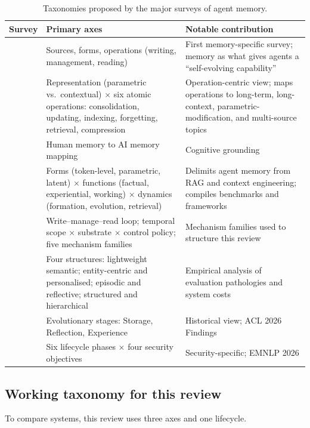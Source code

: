 \documentclass[11pt]{article}
\begin{document}
\begin{table}[t]
\centering\small
\begin{tabularx}{\textwidth}{L{3.2cm} L{6.2cm} X}
\toprule
\textbf{Survey} & \textbf{Primary axes} & \textbf{Notable contribution} \\
\midrule
\citet{zhang2024survey} & Sources, forms, operations (writing, management, reading) & First memory-specific survey; memory as what gives agents a ``self-evolving capability'' \\
\citet{du2025rethinking} & Representation (parametric vs.\ contextual) $\times$ six atomic operations: consolidation, updating, indexing, forgetting, retrieval, compression & Operation-centric view; maps operations to long-term, long-context, parametric-modification, and multi-source topics \\
\citet{wu2025humanmemory} & Human memory to AI memory mapping & Cognitive grounding \\
\citet{hu2025memoryage} & Forms (token-level, parametric, latent) $\times$ functions (factual, experiential, working) $\times$ dynamics (formation, evolution, retrieval) & Delimits agent memory from RAG and context engineering; compiles benchmarks and frameworks \\
\citet{du2026memory} & Write--manage--read loop; temporal scope $\times$ substrate $\times$ control policy; five mechanism families & Mechanism families used to structure this review \\
\citet{jiang2026anatomy} & Four structures: lightweight semantic; entity-centric and personalised; episodic and reflective; structured and hierarchical & Empirical analysis of evaluation pathologies and system costs \\
\citet{luo2026storage} & Evolutionary stages: Storage, Reflection, Experience & Historical view; ACL 2026 Findings \\
\citet{lin2026security} & Six lifecycle phases $\times$ four security objectives & Security-specific; EMNLP 2026 \\
\bottomrule
\end{tabularx}
\caption{Taxonomies proposed by the major surveys of agent memory.}
\label{tab:surveys}
\end{table}

\subsection{Working taxonomy for this review}

To compare systems, this review uses three axes and one lifecycle.
\end{document}

